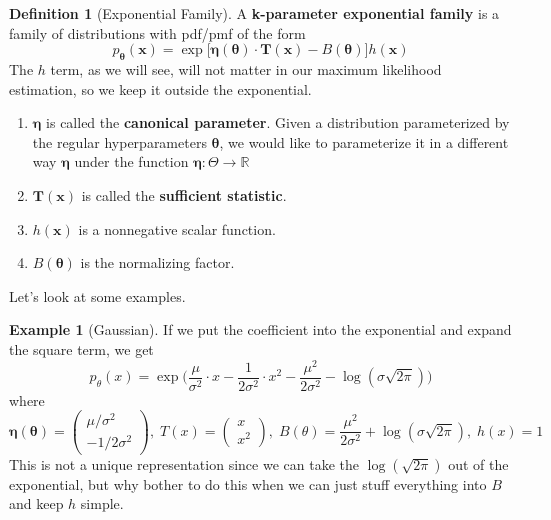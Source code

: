 \documentclass{article}
\theoremstyle{definition}
\newtheorem{example}{Example}[section]
\theoremstyle{remark}
\theoremstyle{definition}
\newtheorem{definition}{Definition}[section]
\begin{document}
\begin{definition}[Exponential Family]
A \textbf{k-parameter exponential family} is a family of distributions with pdf/pmf of the form 
\[p_{\boldsymbol{\theta}} (\mathbf{x}) = \exp\big[ \boldsymbol{\eta}(\boldsymbol{\theta}) \cdot \mathbf{T}(\mathbf{x}) - B(\boldsymbol{\theta}) \big] h(\mathbf{x})\]
The $h$ term, as we will see, will not matter in our maximum likelihood estimation, so we keep it outside the exponential. 
\begin{enumerate}
    \item $\boldsymbol{\eta}$ is called the \textbf{canonical parameter}. Given a distribution parameterized by the regular hyperparameters $\boldsymbol{\theta}$, we would like to parameterize it in a different way $\boldsymbol{\eta}$ under the function $\boldsymbol{\eta}: \Theta \rightarrow \mathbb{R}$

    \item $\mathbf{T}(\mathbf{x})$ is called the \textbf{sufficient statistic}. 

    \item $h(\mathbf{x})$ is a nonnegative scalar function. 

    \item $B(\boldsymbol{\theta})$ is the normalizing factor. 
\end{enumerate}
\end{definition}

Let's look at some examples. 

\begin{example}[Gaussian]
If we put the coefficient into the exponential and expand the square term, we get 
\[p_\theta (x) = \exp \bigg( \frac{\mu}{\sigma^2} \cdot x - \frac{1}{2\sigma^2} \cdot x^2 - \frac{\mu^2}{2 \sigma^2} - \log ( \sigma \sqrt{2 \pi}) \bigg)\] 
where 
\[\boldsymbol{\eta}(\boldsymbol{\theta}) = \begin{pmatrix} \mu /\sigma^2 \\ -1 / 2 \sigma^2 \end{pmatrix}, \; T(x) = \begin{pmatrix} x \\ x^2 \end{pmatrix}, \; B(\theta) = \frac{\mu^2}{2 \sigma^2} + \log(\sigma \sqrt{2 \pi}), \; h(x) = 1\]
This is not a unique representation since we can take the $\log(\sqrt{2 \pi})$ out of the exponential, but why bother to do this when we can just stuff everything into $B$ and keep $h$ simple. 
\end{example}
\end{document}
